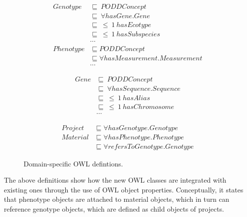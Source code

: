 \documentclass{elsarticle}
\begin{document}
\vspace{-8pt}
\begin{figure}[htb]
\small
\centering
\begin{minipage}[t]{.55\linewidth}
\centering
\begin{align*}
Genotype &\sqsubseteq~ PODDConcept\label{for:hasPlan}\\
         &\sqsubseteq~ \forall hasGene.Gene\\
         &\sqsubseteq~ \leq~ 1~ hasEcotype\\
         &\sqsubseteq~ \leq~ 1~ hasSubspecies\\
         &\cdots\\
Phenotype & \sqsubseteq PODDConcept\\
          & \sqsubseteq \forall hasMeasurement.Measurement\\
         &\cdots
\end{align*}
\end{minipage}
\begin{minipage}[t]{.4\linewidth}
\centering
\begin{align*}
Gene & \sqsubseteq~ PODDConcept\\
     & \sqsubseteq~ \forall hasSequence.Sequence\\
     & \sqsubseteq~ \leq~ 1~ hasAlias\\
     & \sqsubseteq~ \leq~ 1~ hasChromosome\\
     & \cdots
\end{align*}
\end{minipage}
\begin{align*}
Project & \sqsubseteq \forall hasGenotype.Genotype\\
Material & \sqsubseteq \forall hasPhenotype.Phenotype\\
         & \sqsubseteq \forall refersToGenotype.Genotype
\end{align*}

\vspace{-8pt}
\caption{Domain-specific OWL defintions.}\label{fig:phe_ont}
\end{figure}

The above definitions show how the new OWL classes are
integrated with existing ones through the use of OWL
object properties. Conceptually, it states that phenotype
objects are attached to material objects, which in turn
can reference genotype objects, which are defined as child
objects of projects.
\end{document}
